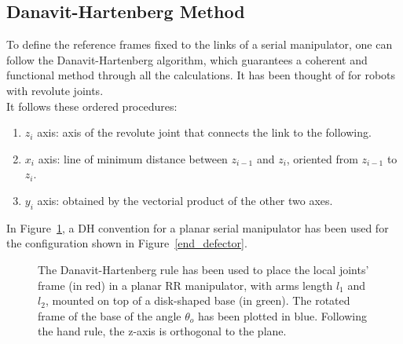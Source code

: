 \documentclass[a4paper,12pt,oneside]{report}
\begin{document}
\subsection{Danavit-Hartenberg Method}
To define the reference frames fixed to the links of a serial manipulator, one can follow the Danavit-Hartenberg algorithm, which guarantees a coherent and functional method through all the calculations. It has been thought of for robots with revolute joints.\\
It follows these ordered procedures:
\begin{enumerate}
  \item $z_i$ axis: axis of the revolute joint that connects the link to the following.
  \item $x_i$ axis: line of minimum distance between $z_{i-1}$ and $z_i$, oriented from $z_{i-1}$ to $z_i$.
  \item $y_i$ axis: obtained by the vectorial product of the other two axes.
\end{enumerate}
In Figure~\ref{DH}, a DH convention for a planar serial manipulator has been used for the configuration shown in Figure~\ref{end_defector}.
\begin{figure}[h]
  \centering
  
  \caption{The Danavit-Hartenberg rule has been used to place the local joints' frame (in red) in a planar RR manipulator, with arms length $l_1$ and $l_2$, mounted on top of a disk-shaped base (in green). The rotated frame of the base of the angle $\theta_o$ has been plotted in blue. Following the hand rule, the z-axis is orthogonal to the plane.}
  \label{DH}
\end{figure}
\end{document}
